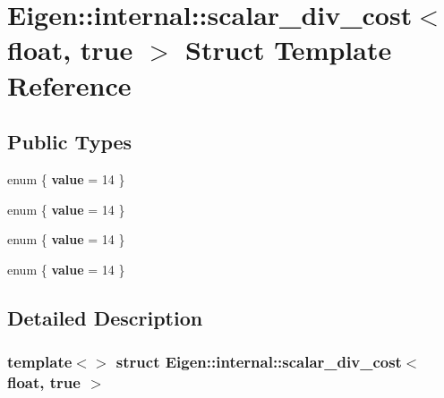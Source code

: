 \hypertarget{struct_eigen_1_1internal_1_1scalar__div__cost_3_01float_00_01true_01_4}{}\section{Eigen\+:\+:internal\+:\+:scalar\+\_\+div\+\_\+cost$<$ float, true $>$ Struct Template Reference}
\label{struct_eigen_1_1internal_1_1scalar__div__cost_3_01float_00_01true_01_4}
\subsection*{Public Types}
\begin{DoxyCompactItemize}
\item 
\mbox{\label{struct_eigen_1_1internal_1_1scalar__div__cost_3_01float_00_01true_01_4_a9ca1148151a8642f61799323b3d06288}} 
enum \{ {\bfseries value} = 14
 \}
\item 
\mbox{\label{struct_eigen_1_1internal_1_1scalar__div__cost_3_01float_00_01true_01_4_ac6e8b0030258943bc49d305ddfa7c43a}} 
enum \{ {\bfseries value} = 14
 \}
\item 
\mbox{\label{struct_eigen_1_1internal_1_1scalar__div__cost_3_01float_00_01true_01_4_a811e2cca323fd8898d3fc4603c2bb5d0}} 
enum \{ {\bfseries value} = 14
 \}
\item 
\mbox{\label{struct_eigen_1_1internal_1_1scalar__div__cost_3_01float_00_01true_01_4_a0b24de72f3f7168deea16f9f6d3d5812}} 
enum \{ {\bfseries value} = 14
 \}
\end{DoxyCompactItemize}


\subsection{Detailed Description}
\subsubsection*{template$<$$>$\newline
struct Eigen\+::internal\+::scalar\+\_\+div\+\_\+cost$<$ float, true $>$}




